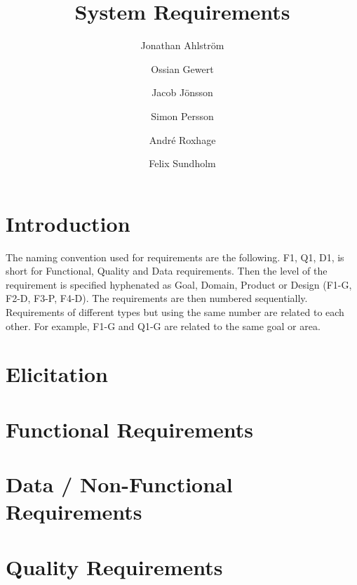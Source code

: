 \documentclass[a4paper]{article}
\title{System Requirements}
\author{Jonathan Ahlström \and Ossian Gewert \and Jacob Jönsson \and Simon Persson \and André Roxhage \and Felix Sundholm}
\begin{document}
\maketitle

\begin{center}
    
\end{center}

\newpage
\tableofcontents
\newpage

\section{Introduction}
The naming convention used for requirements are the following. F1, Q1, D1, is short for Functional, Quality and Data requirements. Then the level of the requirement is specified hyphenated as Goal, Domain, Product or Design (F1-G, F2-D, F3-P, F4-D). The requirements are then numbered sequentially. Requirements of different types but using the same number are related to each other. For example, F1-G and Q1-G are related to the same goal or area.

\section{Elicitation}


\section{Functional Requirements}


\section{Data / Non-Functional Requirements}


\section{Quality Requirements}

\end{document}
